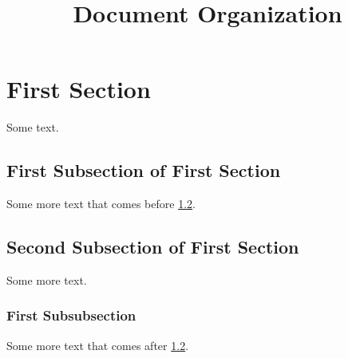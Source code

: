 \documentclass{article}
\title{Document Organization}
\begin{document}
\maketitle

\tableofcontents

\section{First Section}
Some text.

\subsection{First Subsection of First Section}
Some more text that comes before \ref{sec1_2}.

\subsection{Second Subsection of First Section} \label{sec1_2}
Some more text.

\subsubsection{First Subsubsection}
Some more text that comes after \ref{sec1_2}.
\end{document}
